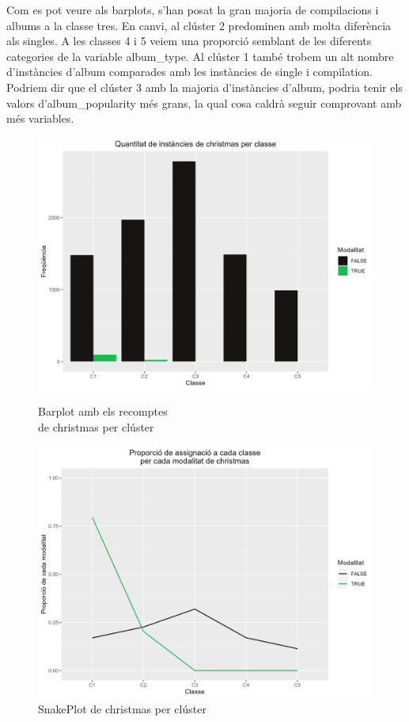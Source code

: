 \documentclass{article}
\begin{document}
Com es pot veure als barplots, s'han posat la gran majoria de compilacions i albums a la classe tres. En canvi, al clúster 2 predominen amb molta diferència als singles. A les classes 4 i 5 veiem una proporció semblant de les diferents categories de la variable album\_type. Al clúster 1 també trobem un alt nombre d'instàncies d'album comparades amb les instàncies de single i compilation. Podriem dir que el clúster 3 amb la majoria d'instàncies d'album, podria tenir els valors d'album\_popularity més grans, la qual cosa caldrà seguir comprovant amb més variables. 

\begin{figure}[H]
\centering
    \begin{minipage}{.49\textwidth}
        \centering
        \includegraphics[width=0.95\linewidth]{Images/5_Profiling/categoriques/cat/Cat_BarPlot_christmas.png}
        \caption{Barplot amb els recomptes \\ de christmas per clúster}
        \label{fig:Cat_BarPlot_christmas}
    \end{minipage}%
    \begin{minipage}{.49\textwidth}
        \centering
        \includegraphics[width=0.95\linewidth]{Images/5_Profiling/categoriques/cat/Cat_SnakePlot_christmas.png}
        \caption{SnakePlot de christmas per clúster}
        \label{fig:Cat_SnakePlot_christmas}
    \end{minipage}%
\end{figure}
\end{document}
